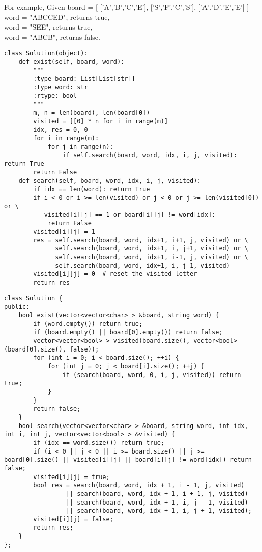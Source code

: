 For example,
Given board =
[
  ['A','B','C','E'],
  ['S','F','C','S'],
  ['A','D','E','E']
]\\

word = "ABCCED", returns true,\\
word = "SEE", returns true,\\
word = "ABCB", returns false.\\

\begin{lstlisting}
class Solution(object):
    def exist(self, board, word):
        """
        :type board: List[List[str]]
        :type word: str
        :rtype: bool
        """
        m, n = len(board), len(board[0])
        visited = [[0] * n for i in range(m)]
        idx, res = 0, 0
        for i in range(m):
            for j in range(n):
                if self.search(board, word, idx, i, j, visited): return True
        return False
    def search(self, board, word, idx, i, j, visited):
        if idx == len(word): return True
        if i < 0 or i >= len(visited) or j < 0 or j >= len(visited[0]) or \
           visited[i][j] == 1 or board[i][j] != word[idx]:
            return False
        visited[i][j] = 1
        res = self.search(board, word, idx+1, i+1, j, visited) or \
              self.search(board, word, idx+1, i, j+1, visited) or \
              self.search(board, word, idx+1, i-1, j, visited) or \
              self.search(board, word, idx+1, i, j-1, visited)
        visited[i][j] = 0  # reset the visited letter
        return res
\end{lstlisting}

\begin{lstlisting}
class Solution {
public:
    bool exist(vector<vector<char> > &board, string word) {
        if (word.empty()) return true;
        if (board.empty() || board[0].empty()) return false;
        vector<vector<bool> > visited(board.size(), vector<bool>(board[0].size(), false));
        for (int i = 0; i < board.size(); ++i) {
            for (int j = 0; j < board[i].size(); ++j) {
                if (search(board, word, 0, i, j, visited)) return true;
            }
        }
        return false;
    }
    bool search(vector<vector<char> > &board, string word, int idx, int i, int j, vector<vector<bool> > &visited) {
        if (idx == word.size()) return true;
        if (i < 0 || j < 0 || i >= board.size() || j >= board[0].size() || visited[i][j] || board[i][j] != word[idx]) return false;
        visited[i][j] = true;
        bool res = search(board, word, idx + 1, i - 1, j, visited) 
                 || search(board, word, idx + 1, i + 1, j, visited)
                 || search(board, word, idx + 1, i, j - 1, visited)
                 || search(board, word, idx + 1, i, j + 1, visited);
        visited[i][j] = false;
        return res;
    }
};
\end{lstlisting}

